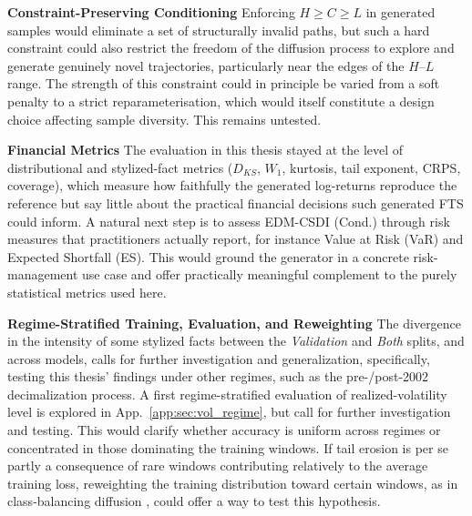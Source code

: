 \textbf{Constraint-Preserving Conditioning} \quad Enforcing $H \geq C \geq L$ 
in generated samples would eliminate a set of structurally invalid paths, but 
such a hard constraint could also restrict the freedom of the diffusion process 
to explore and generate genuinely novel trajectories, particularly near the 
edges of the $H$--$L$ range. The strength of this constraint could in principle 
be varied from a soft penalty to a strict reparameterisation, which would itself 
constitute a design choice affecting sample diversity. This remains untested.

\textbf{Financial Metrics} \quad The evaluation in this thesis stayed at the level of distributional and stylized-fact metrics (\(D_{KS}\), \(W_1\), kurtosis, tail exponent, CRPS, coverage), which measure how faithfully the generated log-returns reproduce the reference but say little about the practical financial decisions such generated FTS could inform. A natural next step is to assess EDM-CSDI (Cond.) through risk measures that practitioners actually report, for instance Value at Risk (VaR) and Expected Shortfall (ES). This would ground the generator in a concrete risk-management use case and offer practically meaningful complement to the purely statistical metrics used here.

\textbf{Regime-Stratified Training, Evaluation, and Reweighting} \quad The divergence in the intensity of some stylized facts between the \emph{Validation} and \emph{Both} splits, and across models, calls for further investigation and generalization, specifically, testing this thesis' findings under other regimes, such as the pre-/post-2002 decimalization process. A first regime-stratified evaluation of realized-volatility level is explored in App.\ \ref{app:sec:vol_regime}, but call for further investigation and testing. This would clarify whether accuracy is uniform across regimes or concentrated in those dominating the training windows. If tail erosion is per se partly a consequence of rare windows contributing relatively to the average training loss, reweighting the training distribution toward certain windows, as in class-balancing diffusion \cite{qin2023classbalancing}, could offer a way to test this hypothesis.
